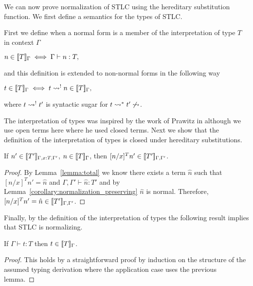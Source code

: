 We can now prove normalization of STLC using the hereditary substitution
function.  We first define a semantics for the types of STLC.
\begin{definition}
  \label{def:interpretation_of_types_stlc}
  First we define when a normal form is a member of the interpretation of type $T$ in context $\Gamma$
  \begin{center}
    \begin{math}
    n \in [\negthinspace[T]\negthinspace]_\Gamma \iff \Gamma \vdash n:T,
  \end{math}
  \end{center}
  and this definition is extended to non-normal forms in the following way
  \begin{center}
    \begin{math}
    t \in [\negthinspace[T]\negthinspace]_\Gamma \iff t \rightsquigarrow^{!} n \in [\negthinspace[T]\negthinspace]_\Gamma,
  \end{math}
  \end{center}
  where $t \rightsquigarrow^{!} t'$ is syntactic sugar for $t \rightsquigarrow^* t' \not \rightsquigarrow$.
\end{definition}
\noindent 
The interpretation of types was inspired by the work of Prawitz in
\cite{Prawitz:2005} although we use open terms here where he used
closed terms.  Next we show that the definition of the interpretation
of types is closed under hereditary substitutions.
\begin{lemma}
  If $n' \in [\negthinspace[T']\negthinspace]_{\Gamma,x:T,\Gamma'}$, $n \in [\negthinspace[T]\negthinspace]_\Gamma$, then 
  $[n/x]^T n' \in [\negthinspace[T']\negthinspace]_{\Gamma,\Gamma'}$.
  
  \label{lemma:interpretation_of_types_closed_substitution_stlc}
\end{lemma}
\begin{proof}
  By Lemma~\ref{lemma:total} we know there exists a term $\hat{n}$ 
  such that $[n/x]^T n' = \hat{n}$ and $\Gamma,\Gamma' \vdash \hat{n}:T'$ and by 
  Lemma~\ref{corollary:normalization_preserving} $\hat{n}$ is normal.  Therefore,
  $[n/x]^T n' = \hat{n} \in [\negthinspace[T']\negthinspace]_{\Gamma,\Gamma'}$.
\end{proof}
\noindent
Finally, by the definition of the interpretation of types the
following result implies that STLC is normalizing.
\begin{thm}
  If $\Gamma \vdash t:T$ then $t \in [\negthinspace[T]\negthinspace]_\Gamma$.
  \label{thm:soundness_stlc}
\end{thm}
\begin{proof}
  This holds by a straightforward proof by induction on the structure
  of the assumed typing derivation where the application case uses the
  previous lemma.
\end{proof}

